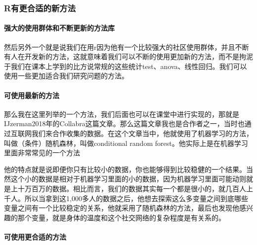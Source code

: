 \documentclass[
  oneside]{book}
\begin{document}
\hypertarget{rux6709ux66f4ux5408ux9002ux7684ux65b0ux65b9ux6cd5}{%
\subsubsection{R有更合适的新方法}\label{rux6709ux66f4ux5408ux9002ux7684ux65b0ux65b9ux6cd5}}

\hypertarget{ux5f3aux5927ux7684ux4f7fux7528ux7fa4ux4f53ux548cux4e0dux65adux66f4ux65b0ux7684ux65b9ux6cd5ux5e93}{%
\paragraph{强大的使用群体和不断更新的方法库}\label{ux5f3aux5927ux7684ux4f7fux7528ux7fa4ux4f53ux548cux4e0dux65adux66f4ux65b0ux7684ux65b9ux6cd5ux5e93}}

然后另外一个就是说我们在用r因为他有一个比较强大的社区使用群体，并且不断有人在开发新的方法，这就意味着我们可以不断的使用更加新的方法，而不是拘泥于我们在课本上学到的比方说常规的这些统计test、anova、线性回归。我们可以使用一些更加适合我们研究问题的方法。

\hypertarget{ux53efux4f7fux7528ux6700ux65b0ux7684ux65b9ux6cd5}{%
\paragraph{可使用最新的方法}\label{ux53efux4f7fux7528ux6700ux65b0ux7684ux65b9ux6cd5}}

那么我在这里列举的一个方法，我们后面也可以在课堂中进行实现的，那就是IJzerman2018年的Collabra这篇文章。那么这篇文章我也是合作者之一，当时也通过互联网我们来合作收集的数据。在这个文章当中，他就使用了机器学习的方法，叫做（条件）随机森林，叫做conditional random forest。他实际上是在机器学习里面非常常见的一个方法

他的特点就是说即便你只有比较小的数据，你也能够得到比较稳健的一个结果。当然这个小的数据是相对于机器学习里面的小的数据，因为机器学习里面可能动则就是上十万百万的数据。相比而言，我们的数据其实每一个都是很小的，就几百人上千人。所以当拿到这1,000多人的数据之后，他想去探索这么多变量之间到底哪些变量之间有一个比较稳定的关系，他就采用了随机森林的方法，最后也发现他感兴趣的那个变量，就是身体的温度和这个社交网络的复杂程度是有关系的。

\hypertarget{ux53efux4f7fux7528ux66f4ux5408ux9002ux7684ux65b9ux6cd5}{%
\paragraph{可使用更合适的方法}\label{ux53efux4f7fux7528ux66f4ux5408ux9002ux7684ux65b9ux6cd5}}
\end{document}
